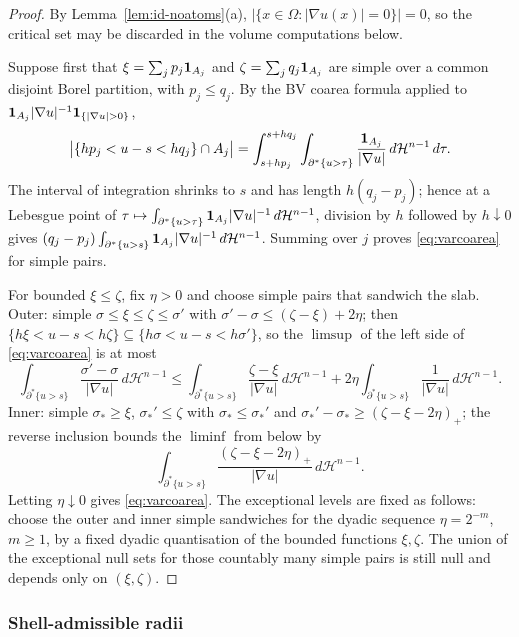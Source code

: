 \documentclass[11pt]{amsart}
\theoremstyle{definition}
\newcommand{\Om}{\Omega}
\newcommand{\Hn}{\mathcal H^{n-1}}
\begin{document}
\begin{proof}
By Lemma~\ref{lem:id-noatoms}(a), \(|\{x\in\Om:|\nabla u(x)|=0\}|=0\), so the
critical set may be discarded in the volume computations below.

Suppose first that \(\xi=\sum_j p_j{\bf1}_{A_j}\) and
\(\zeta=\sum_j q_j{\bf1}_{A_j}\) are simple over a common disjoint Borel
partition, with \(p_j\le q_j\).  By the BV coarea formula applied to
\({\bf1}_{A_j}|\nabla u|^{-1}{\bf1}_{\{|\nabla u|>0\}}\),
\[
   \bigl|\{hp_j<u-s<hq_j\}\cap A_j\bigr|
   =
   \int_{s+hp_j}^{s+hq_j}
      \int_{\partial^*\{u>\tau\}}\frac{{\bf1}_{A_j}}{|\nabla u|}
      \,d\Hn\,d\tau .
\]
The interval of integration shrinks to \(s\) and has length
\(h(q_j-p_j)\); hence at a Lebesgue point of
\(\tau\mapsto\int_{\partial^*\{u>\tau\}}{\bf1}_{A_j}|\nabla u|^{-1}\,d\Hn\),
division by \(h\) followed by \(h\downarrow0\) gives
\((q_j-p_j)\int_{\partial^*\{u>s\}}{\bf1}_{A_j}|\nabla u|^{-1}\,d\Hn\).
Summing over \(j\) proves \eqref{eq:varcoarea} for simple pairs.

For bounded \(\xi\le\zeta\), fix \(\eta>0\) and choose simple pairs that
sandwich the slab.  Outer: simple \(\sigma\le\xi\le\zeta\le\sigma'\) with
\(\sigma'-\sigma\le(\zeta-\xi)+2\eta\); then
\(\{h\xi<u-s<h\zeta\}\subseteq\{h\sigma<u-s<h\sigma'\}\), so the
\(\limsup\) of the left side of \eqref{eq:varcoarea} is at most
\[
   \int_{\partial^*\{u>s\}}\frac{\sigma'-\sigma}{|\nabla u|}\,d\Hn
   \le
   \int_{\partial^*\{u>s\}}\frac{\zeta-\xi}{|\nabla u|}\,d\Hn
   +2\eta\int_{\partial^*\{u>s\}}\frac1{|\nabla u|}\,d\Hn .
\]
Inner: simple \(\sigma_*\ge\xi\),
\(\sigma_*'\le\zeta\) with \(\sigma_*\le\sigma_*'\) and
\(\sigma_*'-\sigma_*\ge(\zeta-\xi-2\eta)_+\); the reverse inclusion bounds
the \(\liminf\) from below by
\[
   \int_{\partial^*\{u>s\}}
      \frac{(\zeta-\xi-2\eta)_+}{|\nabla u|}\,d\Hn .
\]
Letting \(\eta\downarrow0\) gives \eqref{eq:varcoarea}.  The exceptional
levels are fixed as follows: choose the outer and inner simple sandwiches for
the dyadic sequence \(\eta=2^{-m}\), \(m\ge1\), by a fixed dyadic
quantisation of the bounded functions \(\xi,\zeta\).  The union of the
exceptional null sets for those countably many simple pairs is still null and
depends only on \((\xi,\zeta)\).
\end{proof}

\subsubsection*{Shell-admissible radii}
\end{document}
